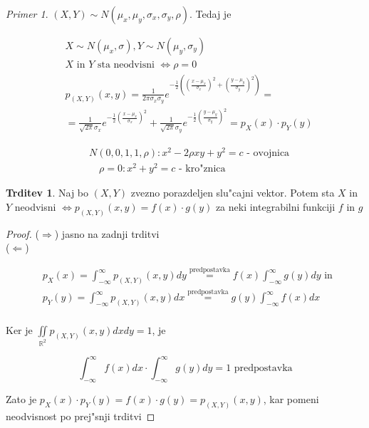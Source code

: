 \documentclass[a4paper,12pt]{article}
\theoremstyle{definition}
\newtheorem{claim}[counter]{Trditev}
\theoremstyle{remark}
\newtheorem*{ex}{Primer}
\newcommand{\R}{\mathbb{R}}
\begin{document}
\begin{ex}
    $(X,Y) \sim N(\mu_x, \mu_y, \sigma_x, \sigma_y, \rho)$. Tedaj je

    \begin{align*}
        &X \sim N(\mu_x, \sigma), Y \sim N(\mu_y, \sigma_y) \\
        &X \text{ in } Y \text{ sta neodvisni } \iff \rho = 0 \\
        &p_{(X,Y)}(x,y) = \frac{1}{2\pi \sigma_x \sigma_y} e^{-\frac{1}{2} ((\frac{x-\mu_x}{\sigma_x})^2 +
            (\frac{y-\mu_y}{\sigma_y})^2)} = \\
        &= \frac{1}{\sqrt{2\pi} \sigma_x} e^{-\frac{1}{2} (\frac{x-\mu_x}{\sigma_x})^2} +
            \frac{1}{\sqrt{2\pi} \sigma_y} e^{-\frac{1}{2} (\frac{y-\mu_y}{\sigma_y})^2} = p_X(x) \cdot p_Y(y)
    \end{align*}

    \begin{align*}
        &N(0,0,1,1,\rho): x^2 - 2\rho x y + y^2 = c \text{ - ovojnica} \\
        &\quad \rho = 0: x^2 + y^2 = c \text{ - kro"znica}
    \end{align*}
\end{ex}

\begin{claim}
    Naj bo $(X,Y)$ zvezno porazdeljen slu"cajni vektor. Potem sta $X$ in $Y$ neodvisni $\iff p_{(X,Y)}(x,y) =
    f(x) \cdot g(y)$ za neki integrabilni funkciji $f$ in $g$
\end{claim}

\begin{proof}
    ($\Rightarrow$) jasno na zadnji trditvi \\
    ($\Leftarrow$)

    \begin{align*}
        &p_X(x) = \int_{-\infty}^{\infty} p_{(X,Y)}(x,y) dy \stackrel{\text{predpostavka}}{=}
            f(x) \int_{-\infty}^{\infty} g(y) dy \text{ in } \\
        &p_Y(y) = \int_{-\infty}^{\infty} p_{(X,Y)}(x,y) dx \stackrel{\text{predpostavka}}{=}
            g(y) \int_{-\infty}^{\infty} f(x) dx \\
    \end{align*}

    Ker je $\iint\limits_{\R^2} p_{(X,Y)}(x,y) dx dy = 1$, je

    \begin{equation*}
        \int_{-\infty}^{\infty} f(x) dx \cdot \int_{-\infty}^{\infty} g(y) dy = 1 \text{ predpostavka}
    \end{equation*}

    Zato je $p_X(x) \cdot p_Y(y) = f(x) \cdot g(y) = p_{(X,Y)}(x,y)$, kar pomeni neodvisnost po prej"snji trditvi
\end{proof}
\end{document}
